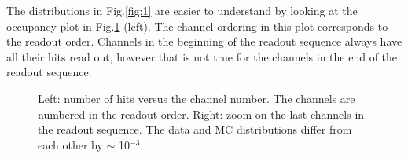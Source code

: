 The distributions in Fig.\ref{fig:1} are easier to understand by looking at the occupancy plot in Fig.\ref{fig:2} (left).
The channel ordering in this plot corresponds to the readout order.
Channels in the beginning of the readout sequence always have all their hits read out,
  however that is not true for the channels in the end of the readout sequence.
\begin{figure}[!h]
  \hspace{-0.5in}
  \caption{
    \label{fig:2}
    Left: number of hits versus the channel number. The channels are numbered in the readout order.
    Right: zoom on the last channels in the readout sequence. The data and MC distributions
    differ from each other by $\sim$ 10$^{-3}$.
  }
\end{figure}

